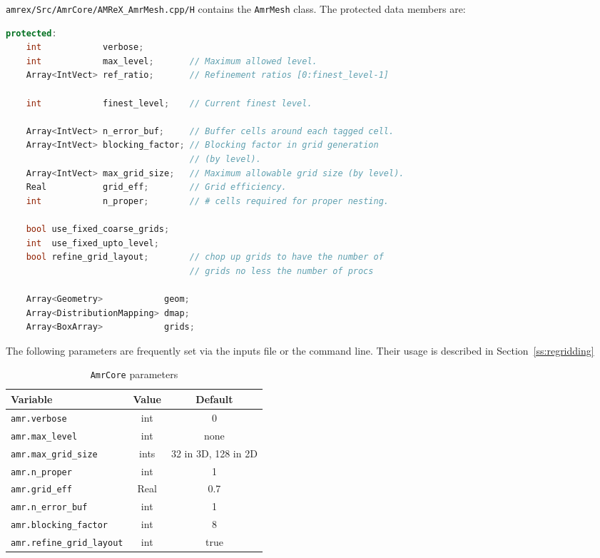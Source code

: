 {\tt amrex/Src/AmrCore/AMReX\_AmrMesh.cpp/H} contains the {\tt AmrMesh} class.
The protected data members are:
\begin{lstlisting}[language=cpp]
protected:
    int            verbose;
    int            max_level;       // Maximum allowed level.
    Array<IntVect> ref_ratio;       // Refinement ratios [0:finest_level-1]

    int            finest_level;    // Current finest level.

    Array<IntVect> n_error_buf;     // Buffer cells around each tagged cell.
    Array<IntVect> blocking_factor; // Blocking factor in grid generation 
                                    // (by level).
    Array<IntVect> max_grid_size;   // Maximum allowable grid size (by level).
    Real           grid_eff;        // Grid efficiency.
    int            n_proper;        // # cells required for proper nesting.

    bool use_fixed_coarse_grids;
    int  use_fixed_upto_level;
    bool refine_grid_layout;        // chop up grids to have the number of 
                                    // grids no less the number of procs

    Array<Geometry>            geom;
    Array<DistributionMapping> dmap;
    Array<BoxArray>            grids;    
\end{lstlisting}

The following parameters are frequently set via the inputs file or the command line.  
Their usage is described in Section~\ref{ss:regridding}

\begin{table}[h]
  \centering
  \begin{tabular}{lcc}
    Variable & Value & Default \\
    \hline
    {\tt amr.verbose}              & int  & 0    \\
    {\tt amr.max\_level}           & int  & none \\
    {\tt amr.max\_grid\_size}      & ints & 32 in 3D, 128 in 2D \\
    {\tt amr.n\_proper}            & int  & 1    \\
    {\tt amr.grid\_eff}            & Real & 0.7  \\
    {\tt amr.n\_error\_buf}        & int  & 1    \\
    {\tt amr.blocking\_factor}     &int   & 8    \\
    {\tt amr.refine\_grid\_layout} &int   & true \\
    \hline
  \end{tabular}
  \caption{\label{tab:makevarimp} {\tt AmrCore} parameters}
\end{table}


